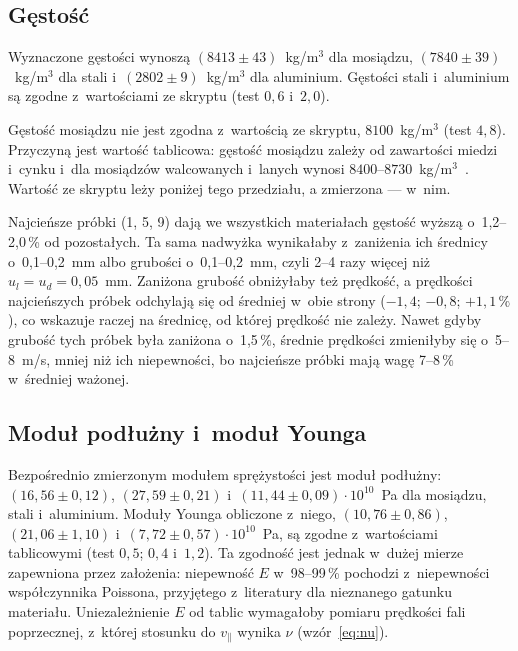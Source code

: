 \documentclass[12pt, a4paper]{article}
\begin{document}
\subsection{Gęstość}

Wyznaczone gęstości wynoszą $(8413 \pm 43)$~kg/m$^3$ dla mosiądzu, $(7840 \pm 39)$~kg/m$^3$
dla stali i~$(2802 \pm 9)$~kg/m$^3$ dla aluminium. Gęstości stali i~aluminium są zgodne
z~wartościami ze skryptu (test $0{,}6$ i~$2{,}0$).

Gęstość mosiądzu nie jest zgodna z~wartością ze skryptu, $8100$~kg/m$^3$ (test $4{,}8$).
Przyczyną jest wartość tablicowa: gęstość mosiądzu zależy od zawartości miedzi i~cynku
i~dla mosiądzów walcowanych i~lanych wynosi $8400$--$8730$~kg/m$^3$~\cite{density}. Wartość
ze skryptu leży poniżej tego przedziału, a zmierzona --- w~nim.

Najcieńsze próbki (1, 5, 9) dają we wszystkich materiałach gęstość wyższą o~1,2--2,0\,\% od
pozostałych. Ta sama nadwyżka wynikałaby z~zaniżenia ich średnicy o~0,1--0,2~mm albo grubości
o~0,1--0,2~mm, czyli 2--4 razy więcej niż $u_l = u_d = 0{,}05$~mm. Zaniżona grubość obniżyłaby
też prędkość, a prędkości najcieńszych próbek odchylają się od średniej w~obie strony
($-1{,}4$; $-0{,}8$; $+1{,}1\,\%$), co wskazuje raczej na średnicę, od której prędkość nie zależy.
Nawet gdyby grubość tych próbek była zaniżona o~1,5\,\%, średnie prędkości zmieniłyby się
o~5--8~m/s, mniej niż ich niepewności, bo najcieńsze próbki mają wagę 7--8\,\% w~średniej
ważonej.

\subsection{Moduł podłużny i~moduł Younga}

Bezpośrednio zmierzonym modułem sprężystości jest moduł podłużny: $(16{,}56 \pm 0{,}12)$,
$(27{,}59 \pm 0{,}21)$ i~$(11{,}44 \pm 0{,}09) \cdot 10^{10}$~Pa dla mosiądzu, stali i~aluminium.
Moduły Younga obliczone z~niego, $(10{,}76 \pm 0{,}86)$, $(21{,}06 \pm 1{,}10)$
i~$(7{,}72 \pm 0{,}57) \cdot 10^{10}$~Pa, są zgodne z~wartościami tablicowymi (test $0{,}5$;
$0{,}4$ i~$1{,}2$). Ta zgodność jest jednak w~dużej mierze zapewniona przez założenia: niepewność
$E$ w~98--99\,\% pochodzi z~niepewności współczynnika Poissona, przyjętego z~literatury dla
nieznanego gatunku materiału. Uniezależnienie $E$ od tablic wymagałoby pomiaru prędkości fali
poprzecznej, z~której stosunku do $v_\parallel$ wynika $\nu$ (wzór~\eqref{eq:nu}).
\end{document}

